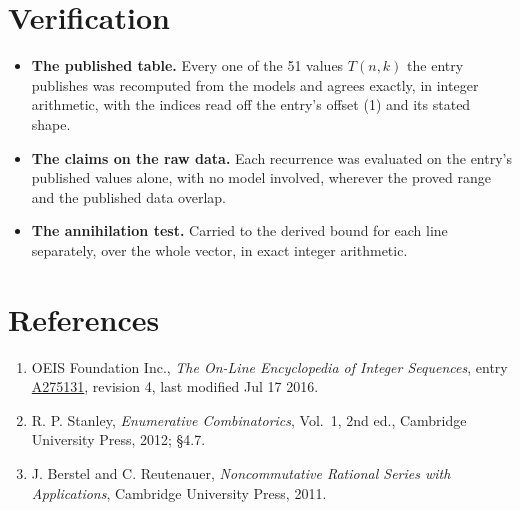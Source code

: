 \documentclass[11pt]{article}
\theoremstyle{definition}
\begin{document}
\section{Verification}

\begin{itemize}

\item {\bfseries The published table.} Every one of the 51 values $T(n,k)$ the entry publishes was recomputed from the models and agrees exactly, in integer arithmetic, with the indices read off the entry's offset (1) and its stated shape.

\item {\bfseries The claims on the raw data.} Each recurrence was evaluated on the entry's published values alone, with no model involved, wherever the proved range and the published data overlap.

\item {\bfseries The annihilation test.} Carried to the derived bound for each line separately, over the whole vector, in exact integer arithmetic.

\end{itemize}

\section{References}

\begin{enumerate}

\item OEIS Foundation Inc., \emph{The On-Line Encyclopedia of Integer Sequences}, entry \href{https://oeis.org/A275131}{A275131}, revision 4, last modified Jul 17 2016.

\item R. P. Stanley, \emph{Enumerative Combinatorics}, Vol.~1, 2nd ed., Cambridge University Press, 2012; \S4.7.

\item J. Berstel and C. Reutenauer, \emph{Noncommutative Rational Series with Applications}, Cambridge University Press, 2011.

\end{enumerate}
\end{document}
